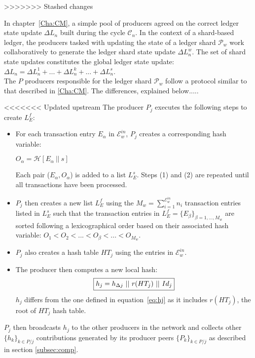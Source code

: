 >>>>>>> Stashed changes

In chapter~\ref{Cha:CM}, a simple pool of producers agreed on the correct ledger state update $\Delta L_n$ built during the cycle $\mathcal{C}_{n}$. In the context of a shard-based ledger, the producers tasked with updating the state of a ledger shard $\mathcal{P}_w$ work collaboratively to generate the ledger shard state update $\Delta L^w_n$. The set of shard state updates constitutes the global ledger state update: $\Delta L_n = \Delta L^1_n + ... + \Delta L^k_n + ...+ \Delta L^s_n$.\\ 

The $P$ producers responsible for the ledger shard $\mathcal{P}_w$ follow a protocol similar to that described in \ref{Cha:CM}. The differences, explained below.....

<<<<<<< Updated upstream
The producer $P_j$ executes the following steps to create $L_E^f$:
\begin{itemize}
\item For each transaction entry $E_\alpha$ in $\mathcal{E}^{in}_w$, $P_j$ creates a corresponding hash variable: 
\begin{center}
$O_\alpha = \mathcal{H}[E_\alpha~||~s]$
\end{center}
Each pair ($E_\alpha,O_\alpha$) is added to a list $L^s_E$. Steps (1) and (2) are repeated until all transactions have been processed.
\item	$P_j$ then creates a new list $L^f_E$ using the $M_w=\sum_{i=1}^{\mathcal{E}^{in}_w}n_i$ transaction entries listed in $L^s_E$ such that the transaction entries in $L^f_E = \{E_\beta\}_{\beta=1,...,M_w}$ are sorted following a lexicographical order based on their associated hash variable: $O_1 < O_2 < ... < O_\beta < ... < O_{M_w}$. 
\item $P_j$ also creates a hash table $HT_j$ using the entries in $\mathcal{E}^{in}_w$.
\item The producer then computes a new local hash:
\begin{equation}
\label{eq:hj_shard}
\fbox{$h_j = h_{\Delta j}~||~r(HT_j)~||~Id_j$}
\end{equation}
$h_j$ differs from the one defined in equation~\ref{eq:hj} as it includes $r(HT_j)$, the root of $HT_j$ hash table.
\end{itemize}
$P_j$ then broadcasts $h_j$ to the other producers in the network and collects other $\{h_k\}_{k \in P/j}$ contributions generated by its producer peers $\{P_k\}_{k \in P/j}$ as described in section \ref{subsec:comp}.\\


